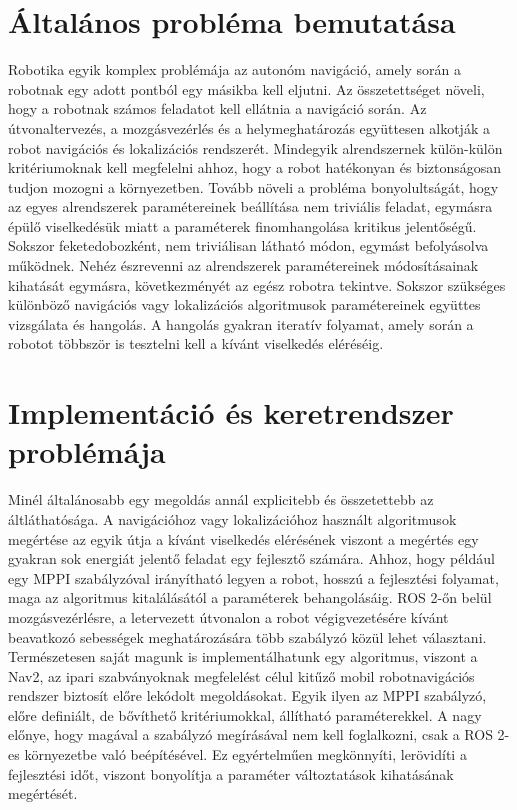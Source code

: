 \section{Általános probléma bemutatása}
Robotika egyik komplex problémája az autonóm navigáció, amely során a robotnak egy adott pontból egy másikba kell eljutni. Az összetettséget növeli, hogy a robotnak számos feladatot kell ellátnia a navigáció során. Az útvonaltervezés, a mozgásvezérlés és a helymeghatározás együttesen alkotják a robot navigációs és lokalizációs rendszerét. Mindegyik alrendszernek külön-külön kritériumoknak kell megfelelni ahhoz, hogy a robot hatékonyan és biztonságosan tudjon mozogni a környezetben. Tovább növeli a probléma bonyolultságát, hogy az egyes alrendszerek paramétereinek beállítása nem triviális feladat, egymásra épülő viselkedésük miatt a paraméterek finomhangolása kritikus jelentőségű. Sokszor feketedobozként, nem triviálisan látható módon, egymást befolyásolva működnek. Nehéz észrevenni az alrendszerek paramétereinek módosításainak kihatását egymásra, következményét az egész robotra tekintve. Sokszor szükséges különböző navigációs vagy lokalizációs algoritmusok paramétereinek együttes vizsgálata és hangolás. A hangolás gyakran iteratív folyamat, amely során a robotot többször is tesztelni kell a kívánt viselkedés eléréséig.

\section{Implementáció és keretrendszer problémája}
Minél általánosabb egy megoldás annál explicitebb és összetettebb az áltláthatósága. A navigációhoz vagy lokalizációhoz használt algoritmusok megértése az egyik útja a kívánt viselkedés elérésének viszont a megértés egy gyakran sok energiát jelentő feladat egy fejlesztő számára. Ahhoz, hogy például egy MPPI szabályzóval irányítható legyen a robot, hosszú a fejlesztési folyamat, maga az algoritmus kitalálásától a paraméterek behangolásáig. ROS 2-őn belül mozgásvezérlésre, a letervezett útvonalon a robot végigvezetésére kívánt beavatkozó sebességek meghatározására több szabályzó közül lehet választani. Természetesen saját magunk is implementálhatunk egy algoritmus, viszont a Nav2, az ipari szabványoknak megfelelést célul kitűző mobil robotnavigációs rendszer biztosít előre lekódolt megoldásokat. Egyik ilyen az MPPI szabályzó, előre definiált, de bővíthető kritériumokkal, állítható paraméterekkel. A nagy előnye, hogy magával a szabályzó megírásával nem kell foglalkozni, csak a ROS 2-es környezetbe való beépítésével. Ez egyértelműen megkönnyíti, lerövidíti a fejlesztési időt, viszont bonyolítja a paraméter változtatások kihatásának megértését.

